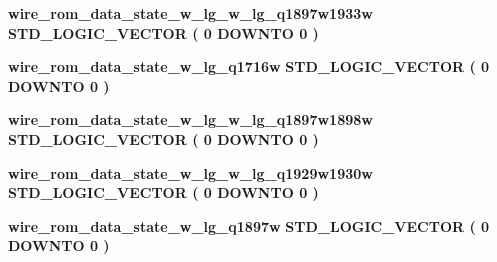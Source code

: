 \begin{DoxyCompactItemize}
\item 
{\bf wire\+\_\+rom\+\_\+data\+\_\+state\+\_\+w\+\_\+lg\+\_\+w\+\_\+lg\+\_\+q1897w1933w} {\bfseries \textcolor{comment}{S\+T\+D\+\_\+\+L\+O\+G\+I\+C\+\_\+\+V\+E\+C\+T\+OR}\textcolor{vhdlchar}{ }\textcolor{vhdlchar}{(}\textcolor{vhdlchar}{ }\textcolor{vhdlchar}{ } \textcolor{vhdldigit}{0} \textcolor{vhdlchar}{ }\textcolor{keywordflow}{D\+O\+W\+N\+TO}\textcolor{vhdlchar}{ }\textcolor{vhdlchar}{ } \textcolor{vhdldigit}{0} \textcolor{vhdlchar}{ }\textcolor{vhdlchar}{)}\textcolor{vhdlchar}{ }} 
\item 
{\bf wire\+\_\+rom\+\_\+data\+\_\+state\+\_\+w\+\_\+lg\+\_\+q1716w} {\bfseries \textcolor{comment}{S\+T\+D\+\_\+\+L\+O\+G\+I\+C\+\_\+\+V\+E\+C\+T\+OR}\textcolor{vhdlchar}{ }\textcolor{vhdlchar}{(}\textcolor{vhdlchar}{ }\textcolor{vhdlchar}{ } \textcolor{vhdldigit}{0} \textcolor{vhdlchar}{ }\textcolor{keywordflow}{D\+O\+W\+N\+TO}\textcolor{vhdlchar}{ }\textcolor{vhdlchar}{ } \textcolor{vhdldigit}{0} \textcolor{vhdlchar}{ }\textcolor{vhdlchar}{)}\textcolor{vhdlchar}{ }} 
\item 
{\bf wire\+\_\+rom\+\_\+data\+\_\+state\+\_\+w\+\_\+lg\+\_\+w\+\_\+lg\+\_\+q1897w1898w} {\bfseries \textcolor{comment}{S\+T\+D\+\_\+\+L\+O\+G\+I\+C\+\_\+\+V\+E\+C\+T\+OR}\textcolor{vhdlchar}{ }\textcolor{vhdlchar}{(}\textcolor{vhdlchar}{ }\textcolor{vhdlchar}{ } \textcolor{vhdldigit}{0} \textcolor{vhdlchar}{ }\textcolor{keywordflow}{D\+O\+W\+N\+TO}\textcolor{vhdlchar}{ }\textcolor{vhdlchar}{ } \textcolor{vhdldigit}{0} \textcolor{vhdlchar}{ }\textcolor{vhdlchar}{)}\textcolor{vhdlchar}{ }} 
\item 
{\bf wire\+\_\+rom\+\_\+data\+\_\+state\+\_\+w\+\_\+lg\+\_\+w\+\_\+lg\+\_\+q1929w1930w} {\bfseries \textcolor{comment}{S\+T\+D\+\_\+\+L\+O\+G\+I\+C\+\_\+\+V\+E\+C\+T\+OR}\textcolor{vhdlchar}{ }\textcolor{vhdlchar}{(}\textcolor{vhdlchar}{ }\textcolor{vhdlchar}{ } \textcolor{vhdldigit}{0} \textcolor{vhdlchar}{ }\textcolor{keywordflow}{D\+O\+W\+N\+TO}\textcolor{vhdlchar}{ }\textcolor{vhdlchar}{ } \textcolor{vhdldigit}{0} \textcolor{vhdlchar}{ }\textcolor{vhdlchar}{)}\textcolor{vhdlchar}{ }} 
\item 
{\bf wire\+\_\+rom\+\_\+data\+\_\+state\+\_\+w\+\_\+lg\+\_\+q1897w} {\bfseries \textcolor{comment}{S\+T\+D\+\_\+\+L\+O\+G\+I\+C\+\_\+\+V\+E\+C\+T\+OR}\textcolor{vhdlchar}{ }\textcolor{vhdlchar}{(}\textcolor{vhdlchar}{ }\textcolor{vhdlchar}{ } \textcolor{vhdldigit}{0} \textcolor{vhdlchar}{ }\textcolor{keywordflow}{D\+O\+W\+N\+TO}\textcolor{vhdlchar}{ }\textcolor{vhdlchar}{ } \textcolor{vhdldigit}{0} \textcolor{vhdlchar}{ }\textcolor{vhdlchar}{)}\textcolor{vhdlchar}{ }} 

\end{DoxyCompactItemize}
